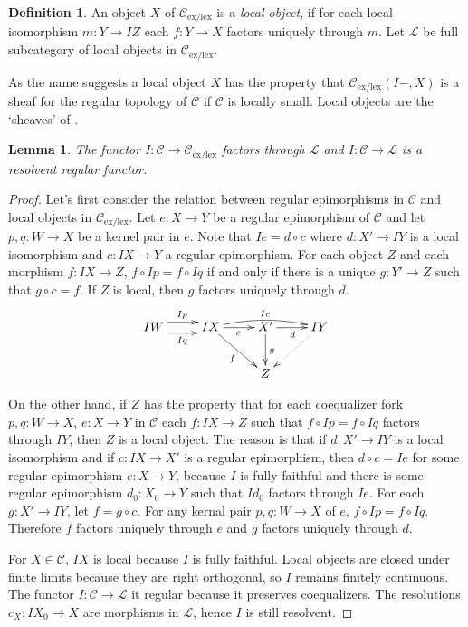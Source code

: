 \documentclass[sort&compress]{elsarticle}
\theoremstyle{plain}
\newtheorem{lemma}[theorem]{Lemma}
\theoremstyle{definition}
\newtheorem{defin}[theorem]{Definition}
\theoremstyle{remark}
\newcommand\cat\mathcal
\newcommand\exlex{_\mathrm{ex/lex}}
\begin{document}
\begin{defin} An object $X$ of $\cat C\exlex$ is a \emph{local object}, if for each local isomorphism $m:Y\to IZ$ each $f:Y \to X$ factors uniquely through $m$. Let $\cat L$ be full subcategory of local objects in $\cat C\exlex$. \end{defin}

As the name suggests a local object $X$ has the property that $\cat C\exlex(I -,X)$ is a sheaf for the regular topology of $\cat C$ if $\cat C$ is locally small. Local objects are the `sheaves' of \citet{MR1870615}.

\begin{lemma} The functor $I:\cat C\to \cat C\exlex$ factors through $\cat L$ and $I:\cat C \to\cat L$ is a \emph{resolvent} regular functor.\label{iberegular} \end{lemma}

\begin{proof} Let's first consider the relation between regular epimorphisms in $\cat C$ and local objects in $\cat C\exlex$.
Let $e:X\to Y$ be a regular epimorphism of $\cat C$ and let $p,q:W\to X$ be a kernel pair in $e$. Note that $Ie = d\circ c$ where $d:X'\to IY$ is a local isomorphism and $c:IX\to Y$ a regular epimorphism. For each object $Z$ and each morphism $f:IX\to Z$, $f\circ Ip = f\circ Iq$ if and only if there is a unique $g:Y'\to Z$ such that $g\circ c= f$. If $Z$ is local, then $g$ factors uniquely through $d$.
\[\xymatrix{
IW \ar@<1ex>[r]^{Ip}\ar@<-1ex>[r]_{Iq} & IX \ar@/^/[rr]^{Ie}\ar[r]_{c}\ar[dr]_f & X'\ar[r]_d\ar[d]^g & IY\ar@{.>}[dl] \\
&& Z
}\]

On the other hand, if $Z$ has the property that for each coequalizer fork $p,q:W\to X$, $e:X\to Y$ in $\cat C$ each $f:IX\to Z$ such that $f\circ Ip=f\circ Iq$ factors through $IY$, then $Z$ is a local object. The reason is that if $d:X'\to IY$ is a local isomorphism and if $c:IX \to X'$ is a regular epimorphism, then $d\circ c = Ie$ for some regular epimorphism $e:X \to Y$, because $I$ is fully faithful and there is some regular epimorphism $d_0: X_0\to Y$ such that $Id_0$ factors through $Ie$. For each $g:X' \to IY$, let $f = g\circ c$. For any kernal pair $p,q:W\to X$ of $e$, $f\circ Ip = f\circ Iq$. Therefore $f$ factors uniquely through $e$ and $g$ factors uniquely through $d$.

For $X\in\cat C$, $IX$ is local because $I$ is fully faithful. Local objects are closed under finite limits because they are right orthogonal, so $I$ remains finitely continuous. The functor $I:\cat C\to\cat L$ it regular because it preserves coequalizers. The resolutions $c_X:IX_0 \to X$ are morphisms in $\cat L$, hence $I$ is still resolvent.
\end{proof}
\end{document}
